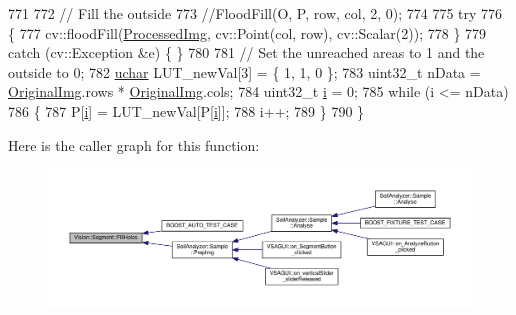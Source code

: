 \begin{DoxyCode}
771 
772         \textcolor{comment}{// Fill the outside}
773         \textcolor{comment}{//FloodFill(O, P, row, col, 2, 0);}
774 
775         \textcolor{keywordflow}{try}
776         \{
777             cv::floodFill(\hyperlink{class_vision_1_1_image_processing_aa7d65742882cd1b2a1e4e9cb68809211}{ProcessedImg}, cv::Point(col, row), cv::Scalar(2));
778         \}
779         \textcolor{keywordflow}{catch} (cv::Exception &e) \{ \}
780 
781         \textcolor{comment}{// Set the unreached areas to 1 and the outside to 0;}
782         \hyperlink{_soil_math_types_8h_a65f85814a8290f9797005d3b28e7e5fc}{uchar} LUT\_newVal[3] = \{ 1, 1, 0 \};
783         uint32\_t nData = \hyperlink{class_vision_1_1_image_processing_a77c370dab270158a4e9c634e2d3f48e7}{OriginalImg}.rows * \hyperlink{class_vision_1_1_image_processing_a77c370dab270158a4e9c634e2d3f48e7}{OriginalImg}.cols;
784         uint32\_t \hyperlink{_comparision_pictures_2_createtest_image_8m_a6f6ccfcf58b31cb6412107d9d5281426}{i} = 0;
785         \textcolor{keywordflow}{while} (i <= nData)
786         \{
787             P[\hyperlink{_comparision_pictures_2_createtest_image_8m_a6f6ccfcf58b31cb6412107d9d5281426}{i}] = LUT\_newVal[P[\hyperlink{_comparision_pictures_2_createtest_image_8m_a6f6ccfcf58b31cb6412107d9d5281426}{i}]];
788             i++;
789         \}
790     \}
\end{DoxyCode}


Here is the caller graph for this function\+:\nopagebreak
\begin{figure}[H]
\begin{center}
\leavevmode
\includegraphics[width=350pt]{class_vision_1_1_segment_a9b1476507a27dbef21acca64efd217b8_icgraph}
\end{center}
\end{figure}


\hypertarget{class_vision_1_1_segment_a62e29f1cc5db86f670c488966a06d644}{}
